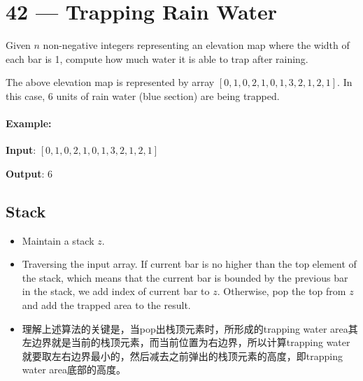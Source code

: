\section{42 --- Trapping Rain Water}
Given $n$ non-negative integers representing an elevation map where the width of each bar is 1, compute how much water it is able to trap after raining.

\begin{figure}[H]
\end{figure}

The above elevation map is represented by array $[0,1,0,2,1,0,1,3,2,1,2,1]$. In this case, 6 units of rain water (blue section) are being trapped.


\paragraph{Example:}

\begin{flushleft}
\textbf{Input}: $[0,1,0,2,1,0,1,3,2,1,2,1]$

\textbf{Output}: 6
\end{flushleft}

\subsection{Stack}
\begin{itemize}
\item Maintain a stack $z$.
\item Traversing the input array. If current bar is no higher than the top element of the stack, which means that the current bar is bounded by the previous bar in the stack, we add index of current bar to $z$. Otherwise, pop the top from $z$ and add the trapped area to the result.
\item 理解上述算法的关键是，当pop出栈顶元素时，所形成的trapping water area其左边界就是当前的栈顶元素，而当前位置为右边界，所以计算trapping water 就要取左右边界最小的，然后减去之前弹出的栈顶元素的高度，即trapping water area底部的高度。
\end{itemize}

